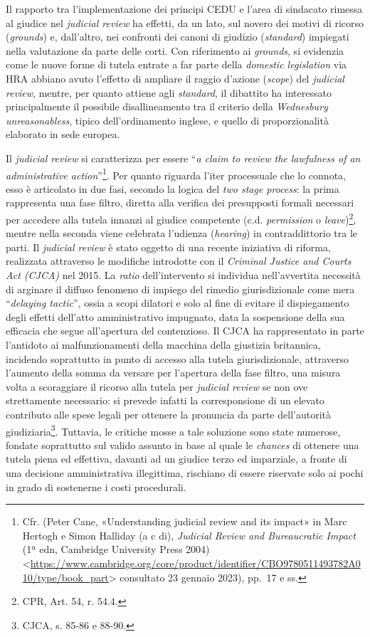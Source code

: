 \documentclass[12pt,it,a4paper,]{report}
\begin{document}
Il rapporto tra l'implementazione dei principi CEDU e l'area di
sindacato rimessa al giudice nel \emph{judicial review} ha effetti, da
un lato, sul novero dei motivi di ricorso (\emph{grounds}) e,
dall'altro, nei confronti dei canoni di giudizio (\emph{standard})
impiegati nella valutazione da parte delle corti. Con riferimento ai
\emph{grounds}, si evidenzia come le nuove forme di tutela entrate a far
parte della \emph{domestic legislation} via HRA abbiano avuto l'effetto
di ampliare il raggio d'azione (\emph{scope}) del \emph{judicial
review}, mentre, per quanto attiene agli \emph{standard}, il dibattito
ha interessato principalmente il possibile disallineamento tra il
criterio della \emph{Wednesbury unreasonabless}, tipico dell'ordinamento
inglese, e quello di proporzionalità elaborato in sede europea.

Il \emph{judicial review} si caratterizza per essere ``\emph{a claim to
review the lawfulness of an administrative action}''\footnote{Cfr.
  (Peter Cane, {«Understanding judicial review and its impact»} in Marc
  Hertogh e Simon Halliday (a c di), \emph{Judicial Review and
  Bureaucratic Impact} (1ª edn, Cambridge University Press 2004)
  \textless{}\url{https://www.cambridge.org/core/product/identifier/CBO9780511493782A010/type/book_part}\textgreater{}
  consultato 23 gennaio 2023), pp.~17 e ss.}. Per quanto riguarda l'iter
processuale che lo connota, esso è articolato in due fasi, secondo la
logica del \emph{two stage process}: la prima rappresenta una fase
filtro, diretta alla verifica dei presupposti formali necessari per
accedere alla tutela innanzi al giudice competente (c.d.
\emph{permission} o \emph{leave})\footnote{CPR, Art. 54, r. 54.4.},
mentre nella seconda viene celebrata l'udienza (\emph{hearing}) in
contraddittorio tra le parti. Il \emph{judicial review} è stato oggetto
di una recente iniziativa di riforma, realizzata attraverso le modifiche
introdotte con il \emph{Criminal Justice and Courts Act (CJCA)} nel
2015. La \emph{ratio} dell'intervento si individua nell'avvertita
necessità di arginare il diffuso fenomeno di impiego del rimedio
giurisdizionale come mera ``\emph{delaying tactic}'', ossia a scopi
dilatori e solo al fine di evitare il dispiegamento degli effetti
dell'atto amministrativo impugnato, data la sospensione della sua
efficacia che segue all'apertura del contenzioso. Il CJCA ha
rappresentato in parte l'antidoto ai malfunzionamenti della macchina
della giustizia britannica, incidendo soprattutto in punto di accesso
alla tutela giurisdizionale, attraverso l'aumento della somma da versare
per l'apertura della fase filtro, una misura volta a scoraggiare il
ricorso alla tutela per \emph{judicial review} se non ove strettamente
necessario: si prevede infatti la corresponsione di un elevato
contributo alle spese legali per ottenere la pronuncia da parte
dell'autorità giudiziaria\footnote{CJCA, s. 85-86 e 88-90.}. Tuttavia,
le critiche mosse a tale soluzione sono state numerose, fondate
soprattutto sul valido assunto in base al quale le \emph{chances} di
ottenere una tutela piena ed effettiva, davanti ad un giudice terzo ed
imparziale, a fronte di una decisione amministrativa illegittima,
rischiano di essere riservate solo ai pochi in grado di sostenerne i
costi procedurali.
\end{document}
